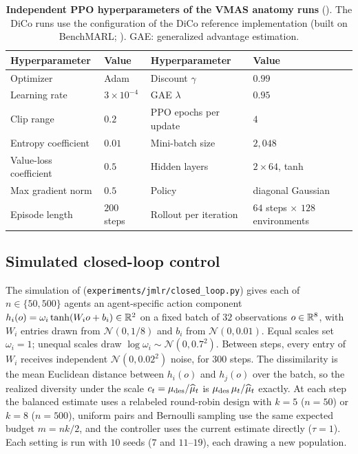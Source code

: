 \begin{table}[ht]
\centering
\small
\caption{\textbf{Independent PPO hyperparameters of the VMAS anatomy runs}
(). The DiCo runs use the configuration of the DiCo
reference implementation (built on BenchMARL; ). GAE: generalized advantage estimation.}
\label{tab:ippo-hparams}
\begin{tabular}{@{}ll@{\qquad}ll@{}}
\toprule
Hyperparameter & Value & Hyperparameter & Value \\
\midrule
Optimizer & Adam & Discount $\gamma$ & $0.99$ \\
Learning rate & $3\times10^{-4}$ & GAE $\lambda$ & $0.95$ \\
Clip range & $0.2$ & PPO epochs per update & $4$ \\
Entropy coefficient & $0.01$ & Mini-batch size & $2{,}048$ \\
Value-loss coefficient & $0.5$ & Hidden layers & $2\times64$, tanh \\
Max gradient norm & $0.5$ & Policy & diagonal Gaussian \\
Episode length & $200$ steps & Rollout per iteration & $64$ steps $\times$ $128$ environments \\
\bottomrule
\end{tabular}
\end{table}

\subsection{Simulated closed-loop control}
\label{app:exp-details:sim-control}

The simulation of  (\texttt{experiments/\allowbreak jmlr/\allowbreak closed\_loop.py})
gives each of ${n\in\{50,500\}}$ agents an agent-specific action component
$h_i(o)=\omega_i\tanh(W_io+b_i)\in\mathbb{R}^2$ on a fixed batch of $32$ observations
$o\in\mathbb{R}^8$, with $W_i$ entries drawn from $\mathcal N(0,1/8)$ and $b_i$ from
$\mathcal N(0,0.01)$. Equal scales set $\omega_i=1$; unequal scales draw
$\log\omega_i\sim\mathcal N(0,0.7^2)$. Between steps, every entry of $W_i$
receives independent $\mathcal N(0,0.02^2)$ noise, for $300$ steps. The
dissimilarity is the mean Euclidean distance between $h_i(o)$ and $h_j(o)$
over the batch, so the realized diversity under the scale
$c_t=\mu_{\mathrm{des}}/\widehat\mu_t$ is $\mu_{\mathrm{des}}\,\mu_t/\widehat\mu_t$ exactly. At each
step the balanced estimate uses a relabeled round-robin design with $k=5$
($n=50$) or $k=8$ ($n=500$), uniform pairs and Bernoulli sampling use the same
expected budget $m=nk/2$, and the controller uses the current estimate
directly ($\tau=1$). Each setting is run with $10$ seeds ($7$ and
$11$--$19$), each drawing a new population.


